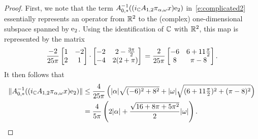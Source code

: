 \begin{proof}
First, we note that the term $A_{0,*}^{-1} (( i_{\mathbb{C}} A_{1,2} \pi_{\alpha,\omega} x)   \mathrm{e}_2 ) $ in~\eqref{e:complicated2} essentially represents an operator from $\mathbb{R}^2$ to the (complex) one-dimensional subspace spanned by $\mathrm{e}_2$. Using the identification of $\mathbb{C}$ with $\mathbb{R}^2$, this map is represented by the matrix 
\[
  \frac{-2 }{25 \pi }
  \left[
  \begin{matrix}
  1 & -2 \\
  2 & 1
  \end{matrix} 
  \right] 
  \cdot
  \left[
  \begin{matrix}
  -2 & 2-\tfrac{3 \pi}{2} \\
  -4  & 2(2+\pi) 
  \end{matrix} 
  \right] \\
  = \frac{2 }{25 \pi }
  \left[
  \begin{matrix}
  -6 & 6+ 11 \tfrac{\pi}{2} \\
  8  & \pi -8
  \end{matrix} 
  \right] .
\]
It then follows that 
\begin{alignat*}{1}
  \| A_{0,*}^{-1} (( i_{\mathbb{C}} A_{1,2} \pi_{\alpha,\omega} x)   \mathrm{e}_2 ) \|
&\leq 	\frac{4}{25 \pi} 
	\left(|\alpha| \sqrt{(-6)^2+8^2}   + 
	 |\omega|  \sqrt{( 6+ 11 \tfrac{\pi}{2} )^2 + (\pi-8)^2} 
	 \right) \\
	&= \frac{4}{5 \pi} \left( 2 |\alpha| + 
	\frac{\sqrt{16+8 \pi +5 \pi ^2}}{2} |\omega| \right) .
\end{alignat*}

%
%
%
%


\end{proof}
